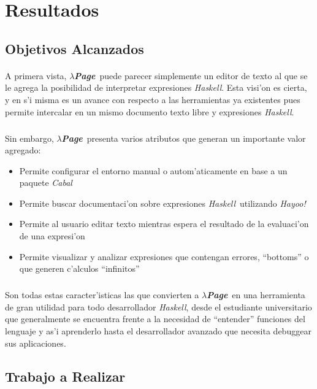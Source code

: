 \documentclass[a4paper]{article}
\newcommand{\haskell}{\textsl{Haskell}}
\newcommand{\hpage}{\textbf{\textsl{$\lambda$Page}}}
\newcommand{\cabal}{\textsl{Cabal}}
\begin{document}
\section{Resultados}
\subsection{Objetivos Alcanzados}
\begin{epigraphs}
\end{epigraphs}
\paragraph{}A primera vista, \hpage\ puede parecer simplemente un editor de texto al que se le agrega la posibilidad de interpretar expresiones \haskell.  Esta visi'on es cierta, y en s'i misma es un avance con respecto a las herramientas ya existentes pues permite intercalar en un mismo documento texto libre y expresiones \haskell.
\subparagraph{}Sin embargo, \hpage\ presenta varios atributos que generan un importante valor agregado:
\begin{itemize}
	\item Permite configurar el entorno manual o autom'aticamente en base a un paquete \cabal
	\item Permite buscar documentaci'on sobre expresiones \haskell\ utilizando \textsl{Hayoo!}
	\item Permite al usuario editar texto mientras espera el resultado de la evaluaci'on de una expresi'on
	\item Permite visualizar y analizar expresiones que contengan errores, ``bottoms'' o que generen c'alculos ``infinitos''
\end{itemize}
\subparagraph{}Son todas estas caracter'isticas las que convierten a \hpage\ en una herramienta de gran utilidad para todo desarrollador \haskell, desde el estudiante universitario que generalmente se encuentra frente a la necesidad de ``entender''  funciones del lenguaje y as'i aprenderlo hasta el desarrollador avanzado que necesita debuggear sus aplicaciones.
\subsection{Trabajo a Realizar}
\begin{epigraphs}
\end{epigraphs}
\end{document}
